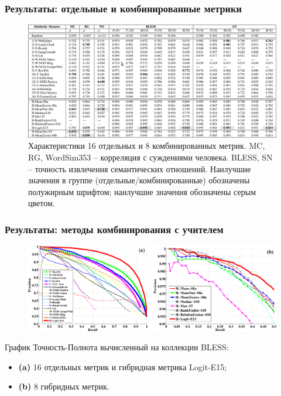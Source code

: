 \begin{frame}
\frametitle{Результаты: отдельные и комбинированные метрики }


    \begin{figure}
    \centering
        \includegraphics[width=1.0\textwidth]{figures/table-hybrid}
        \caption{
        \footnotesize
        Характеристики 16 отдельных и 8 комбинированных метрик. MC, RG, WordSim353 -- корреляция с суждениями человека. BLESS, SN -- точность извлечения семантических отношений. Наилучшие значения в группе (отдельные/комбинированные) обозначены полужирным шрифтом; наилучшие значения  обозначены серым цветом. }
\end{figure}
    
\end{frame}




\begin{frame}
\frametitle{Результаты: методы комбинирования с учителем}
\begin{figure}
\centering
\includegraphics[width=1.0\textwidth]{figures/pr}

\end{figure}

График Точность-Полнота вычисленный на коллекции BLESS:
\begin{itemize}
  \item \textbf{(a)} 16 отдельных метрик и гибридная метрика Logit-E15;
  \item \textbf{(b)} 8 гибридных метрик.
\end{itemize}

\end{frame}



